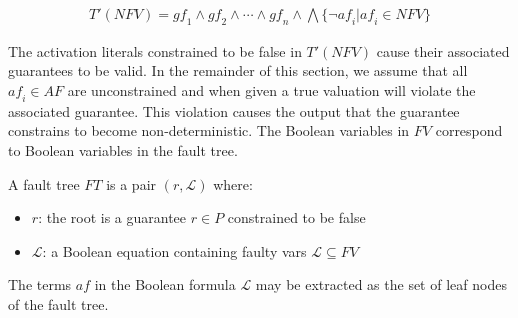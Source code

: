 \begin{gather*}
T'(\mathit{NFV}) = \mathit{gf}_1 \land \mathit{gf}_2 \land \cdots \land \mathit{gf}_n \land \bigwedge \{\neg \mathit{af}_i | \mathit{af}_i \in \mathit{NFV} \}
\end{gather*}

The activation literals constrained to be false in $T'(\mathit{NFV})$ cause their associated guarantees to be valid. In the remainder of this section, we assume that all $\mathit{af}_i \in \mathit{AF}$ are unconstrained and when given a true valuation will violate the associated guarantee. This violation causes the output that the guarantee constrains to become non-deterministic. The Boolean variables in $\mathit{FV}$ correspond to Boolean variables in the fault tree. 



\begin{definition}
A fault tree $\mathit{FT}$ is a pair $(r, \mathcal{L})$ where:
\begin{itemize}
\item[] $r$: the root is a guarantee $r \in P$ constrained to be false
\item[] $\mathcal{L}$: a Boolean equation containing faulty vars $\mathcal{L} \subseteq \mathit{FV}$
\end{itemize}
\end{definition}

The terms $\mathit{af}$  in the Boolean formula $\mathcal{L}$ may be extracted as the set of leaf nodes of the fault tree. 

